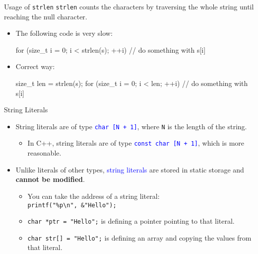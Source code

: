 \documentclass{beamer}
\newcommand{\blue}[1]{\textcolor{blue}{#1}}
\newcommand{\ttt}[1]{\texttt{#1}}
\newcommand{\bluett}[1]{\blue{\ttt{#1}}}
\theoremstyle{definition}
\begin{document}
\begin{frame}[fragile]{Usage of \ttt{strlen}}
    \ttt{strlen} counts the characters by traversing the whole string until reaching the null character.
    \begin{itemize}
        \item The following code is very slow:
        \begin{cpp}
for (size_t i = 0; i < strlen(s); ++i)
  // do something with s[i]
        \end{cpp}
        \pause
        \item Correct way:
        \begin{cpp}
size_t len = strlen(s);
for (size_t i = 0; i < len; ++i)
  // do something with s[i]
        \end{cpp}
    \end{itemize}
\end{frame}

\begin{frame}{String Literals}
    \begin{itemize}
        \item String literals are of type \bluett{char [N + 1]}, where \ttt{N} is the length of the string.
        \begin{itemize}
            \item In C++, string literals are of type \bluett{const char [N + 1]}, which is more reasonable.
        \end{itemize}
        \pause
        \item Unlike literals of other types, \blue{string literals} are stored in static storage and \textbf{cannot be modified}.
        \begin{itemize}
            \item You can take the address of a string literal:\\
            \ttt{printf("\%p\textbackslash n", \&"Hello");}
            \pause
            \item \ttt{char *ptr = "Hello";} is defining a pointer pointing to that literal.
            \item \ttt{char str[] = "Hello";} is defining an array and copying the values from that literal.
        \end{itemize}
    \end{itemize}
\end{frame}
\end{document}
